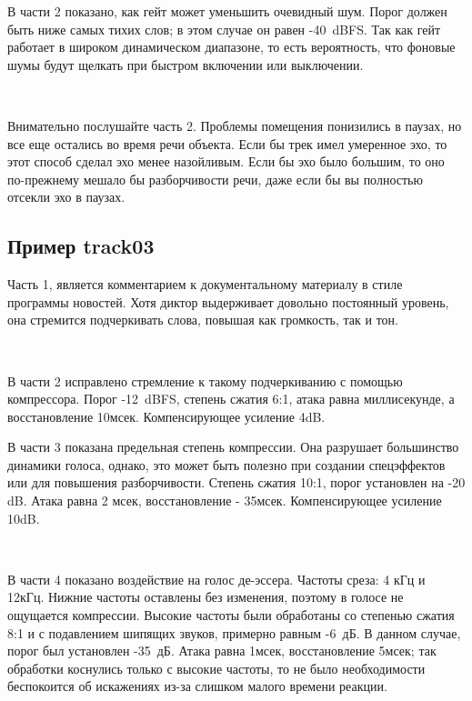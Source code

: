 \documentclass{beamer}
\begin{document}
\begin{frame}
В части 2 показано, как гейт может уменьшить очевидный шум. Порог должен быть ниже самых тихих слов; в этом случае он равен -40~dBFS. Так как гейт работает в широком динамическом диапазоне, то есть  вероятность, что фоновые шумы будут щелкать при быстром включении или выключении.

~

Внимательно послушайте часть 2. Проблемы помещения понизились в паузах, но все еще остались во время речи объекта. Если бы трек имел умеренное эхо, то этот способ сделал эхо менее назойливым. Если бы эхо было большим, то оно по-прежнему мешало бы разборчивости речи, даже если бы вы полностью отсекли эхо в паузах.
\end{frame}

\subsection{Пример track03}
\begin{frame}
Часть 1, является комментарием к документальному материалу в стиле программы новостей. Хотя диктор выдерживает довольно постоянный уровень, она стремится подчеркивать слова, повышая как громкость, так и тон.

~

В части 2 исправлено стремление к такому подчеркиванию с помощью компрессора. Порог -12~dBFS, степень сжатия 6:1, атака равна миллисекунде, а восстановление 10мсек. Компенсирующее усиление 4dB.

\end{frame}
\begin{frame}
В части 3 показана предельная степень компрессии. Она разрушает большинство динамики голоса, однако, это может быть полезно при создании спецэффектов или для повышения разборчивости. Степень сжатия 10:1, порог установлен на -20 dB. Атака равна 2 мсек, восстановление - 35мсек. Компенсирующее усиление 10dB.

~

В части 4 показано воздействие на голос де-эссера. Частоты среза: 4 кГц и 12кГц. Нижние частоты оставлены без изменения, поэтому в голосе не ощущается компрессии. Высокие частоты были обработаны со степенью сжатия 8:1 и с подавлением шипящих звуков, примерно равным -6~дБ. В данном случае, порог был установлен -35~дБ. Атака равна 1мсек, восстановление 5мсек; так обработки коснулись только с высокие частоты, то не было необходимости беспокоится об искажениях из-за слишком малого времени реакции.
\end{frame}
\end{document}
